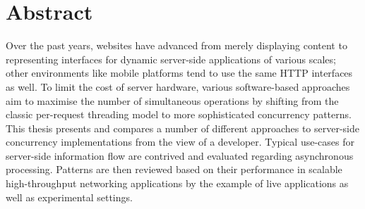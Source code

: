 \chapter{Abstract}

Over the past years, websites have advanced from merely displaying content to representing interfaces for dynamic server-side applications of various scales; other environments like mobile platforms tend to use the same HTTP interfaces as well. To limit the cost of server hardware, various software-based approaches aim to maximise the number of simultaneous operations by shifting from the classic per-request threading model to more sophisticated concurrency patterns. This thesis presents and compares a number of different approaches to server-side concurrency implementations from the view of a developer. Typical use-cases for server-side information flow are contrived and evaluated regarding asynchronous processing. Patterns are then reviewed based on their performance in scalable high-throughput networking applications by the example of live applications as well as experimental settings.